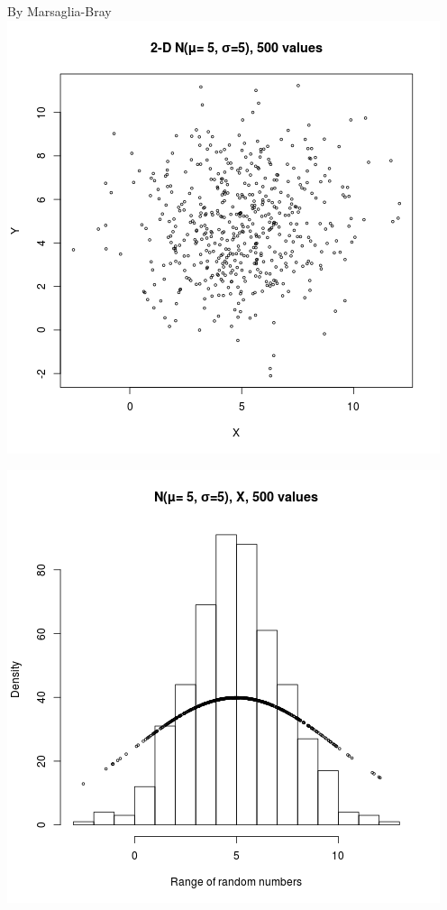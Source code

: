 \documentclass{article}
\begin{document}
By Marsaglia-Bray\\
\includegraphics{"plot4_2"}
\pagebreak

\includegraphics{"plot4_2_X"}
\pagebreak
\end{document}

